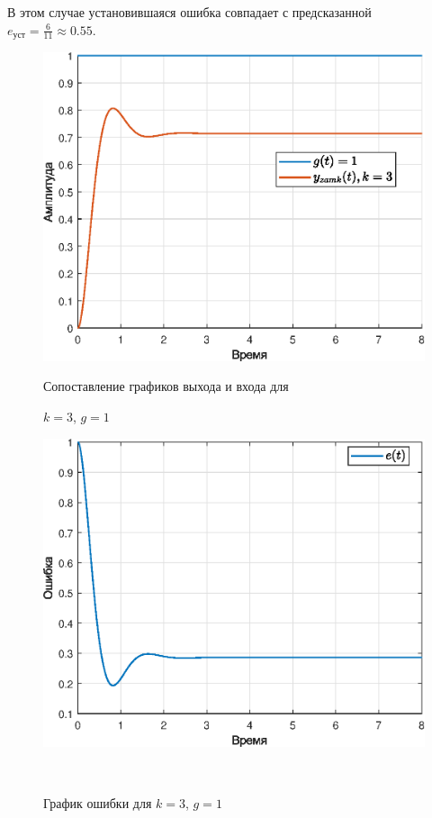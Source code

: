\documentclass[a4paper]{article}
\begin{document}
В этом случае установившаяся ошибка совпадает с предсказанной $e_{\text{уст}} =\frac{6}{11} \approx 0.55$.

\begin{figure}[H]
    \begin{minipage}{0.5\textwidth}
        \centering \includegraphics[width=\textwidth]{ex3/k3_g_a.eps}
        \caption{Сопоставление графиков выхода и входа для}
        \centerline{$k=3$, $g=1$}
    \end{minipage}\hfill
    \begin{minipage}{0.5\textwidth}
        \centering \includegraphics[width=\textwidth]{ex3/k3_g_a_error.eps}
        \caption{График ошибки для $k=3$, $g=1$}
    \end{minipage}\\[1em]
\end{figure}\noindent\
\end{document}

